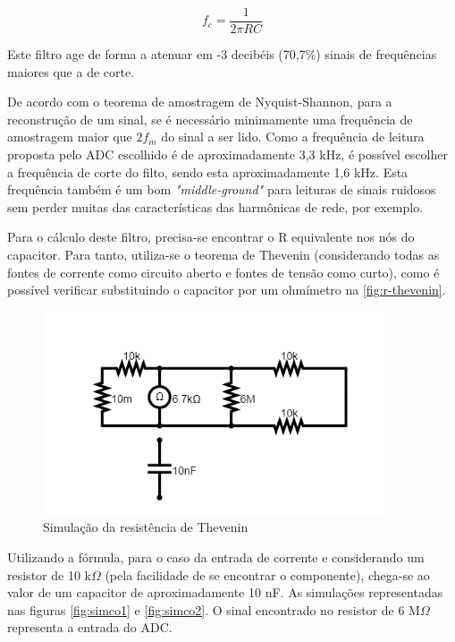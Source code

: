 \begin{equation}
    \label{eqcap}
    f_{c} = \frac{1}{2\pi RC}
\end{equation}

Este filtro age de forma a atenuar em -3 decibéis (70,7\%) sinais de frequências maiores que a de corte.

De acordo com o teorema de amostragem de Nyquist-Shannon, para a reconstrução de um sinal, se é necessário minimamente uma frequência de amostragem maior que $2f_{m}$ do sinal a ser lido. Como a frequência de leitura proposta pelo ADC escolhido é de aproximadamente 3,3 kHz, é possível escolher a frequência de corte do filto, sendo esta aproximadamente 1,6 kHz. Esta frequência também é um bom \textit{"middle-ground"} para leituras de sinais ruidosos sem perder muitas das características das harmônicas de rede, por exemplo.

Para o cálculo deste filtro, precisa-se encontrar o R equivalente nos nós do capacitor. Para tanto, utiliza-se o teorema de Thevenin (considerando todas as fontes de corrente como circuito aberto e fontes de tensão como curto), como é possível verificar substituindo o capacitor por um ohmímetro na \autoref{fig:r-thevenin}.

\begin{figure}[htb!]
    \caption{Simulação da resistência de Thevenin}
    \label{fig:r-thevenin}
    \includegraphics[width=0.9\textwidth]{figuras/r-thevenin.png}
    \fonte{}
\end{figure}

Utilizando a fórmula, para o caso da entrada de corrente e considerando um resistor de 10 k$\Omega$ (pela facilidade de se encontrar o componente), chega-se ao valor de um capacitor de aproximadamente 10 nF. As simulações representadas nas figuras \ref{fig:simco1} e \ref{fig:simco2}. O sinal encontrado no resistor de 6 M$\Omega$ representa a entrada do \gls{ADC}.

